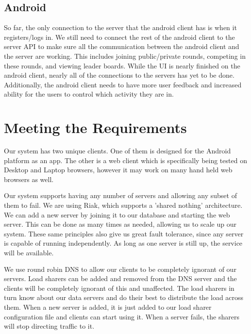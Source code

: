 \documentclass{dependencies/acm_proc_article-sp}
\begin{document}
\subsection {Android}
So far, the only connection to the server that the android client has is when it
registers/logs in. We still need to connect the rest of the android client to
the server API to make sure all the communication between the android client
and the server are working. This includes joining public/private rounds,
competing in these rounds, and viewing leader boards. While the UI is nearly
finished on the android client, nearly all of the connections to the servers
has yet to be done. Additionally, the android client needs to have more user
feedback and increased ability for the users to control which activity they
are in.
\section {Meeting the Requirements}

Our system has two unique clients. One of them is designed for the Android platform as an app.
The other is a web client which is specifically being tested on Desktop and Laptop
browsers, however it may work on many hand held web browsers as well.

Our system supports having any number of servers and allowing any subset of them to fail.
We are using Riak, which supports a 'shared nothing' architecture.  We can add a new server
by joining it to our database and starting the web server.  This can be done as many times
as needed, allowing us to scale up our system.  These same principles also give us great fault
tolerance, since any server is capable of running independently.  As long as one server is still
up, the service will be available.

We use round robin DNS to allow our clients to be completely ignorant of our servers.  Load sharers
can be added and removed from the DNS server and the clients will be completely ignorant of this
and unaffected.  The load sharers in turn know about our data servers and do their best to
distribute the load across them.  When a new server is added, it is just added to our load sharer
configuration file and clients can start using it.  When a server fails, the sharers will stop directing
traffic to it.
\end{document}
